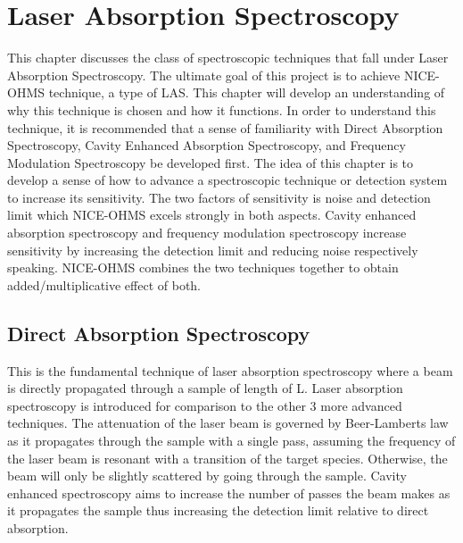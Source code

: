 \documentclass[11pt,a4paper]{book}
\begin{document}
\chapter{Laser Absorption Spectroscopy}
	\label{sec:Laser Absorption Spectroscopy}
	This chapter discusses the class of spectroscopic techniques that fall under Laser Absorption Spectroscopy. The ultimate goal of this project is to achieve NICE-OHMS technique, a type of LAS. This chapter will develop an understanding of why this technique is chosen and how it functions. In order to understand this technique, it is recommended that a sense of familiarity with Direct Absorption Spectroscopy, Cavity Enhanced Absorption Spectroscopy, and Frequency Modulation Spectroscopy be developed first. The idea of this chapter is to develop a sense of how to advance a spectroscopic technique or detection system to increase its sensitivity. The two factors of sensitivity is noise and detection limit which NICE-OHMS excels strongly in both aspects. Cavity enhanced absorption spectroscopy and frequency modulation spectroscopy increase sensitivity by increasing the detection limit and reducing noise respectively speaking. NICE-OHMS combines the two techniques together to obtain added/multiplicative effect of both.

	\section{Direct Absorption Spectroscopy}
	
	\label{sec:Direct Absorption Spectroscopy}
		This is the fundamental technique of laser absorption spectroscopy where a beam is directly propagated through a sample of length of L. Laser absorption spectroscopy is introduced for comparison to the other 3 more advanced techniques. The attenuation of the laser beam is governed by Beer-Lamberts law as it propagates through the sample with a single pass, assuming the frequency of the laser beam is resonant with a transition of the target species. Otherwise, the beam will only be slightly scattered by going through the sample. Cavity enhanced spectroscopy aims to increase the number of passes the beam makes as it propagates the sample thus increasing the detection limit relative to direct absorption.
\end{document}
